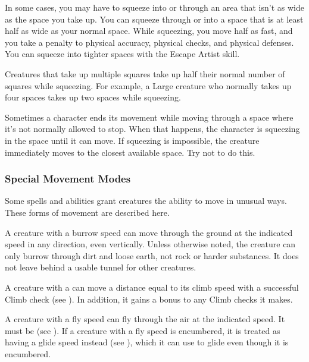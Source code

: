             \label{Squeezing}

            In some cases, you may have to squeeze into or through an area that isn't as wide as the space you take up. You can squeeze through or into a space that is at least half as wide as your normal space. While squeezing, you move half as fast, and you take a  penalty to physical accuracy, physical checks, and physical defenses. You can squeeze into tighter spaces with the Escape Artist skill.

            Creatures that take up multiple squares take up half their normal number of squares while squeezing. For example, a Large creature who normally takes up four spaces takes up two spaces while squeezing.

             Sometimes a character ends its movement while moving through a space where it's not normally allowed to stop. When that happens, the character is squeezing in the space until it can move. If squeezing is impossible, the creature immediately moves to the closest available space. Try not to do this.

        \subsubsection{Special Movement Modes}\label{Special Movement Modes}
            Some spells and abilities grant creatures the ability to move in unusual ways. These forms of movement are described here.

            A creature with a burrow speed can move through the ground at the indicated speed in any direction, even vertically. Unless otherwise noted, the creature can only burrow through dirt and loose earth, not rock or harder substances. It does not leave behind a usable tunnel for other creatures.

            A creature with a  can move a distance equal to its climb speed with a successful Climb check (see ).
            In addition, it gains a  bonus to any Climb checks it makes.

            \label{Flying}
            A creature with a fly speed can fly through the air at the indicated speed. It must be \unencumbered (see ). If a creature with a fly speed is encumbered, it is treated as having a glide speed instead (see ), which it can use to glide even though it is encumbered.

